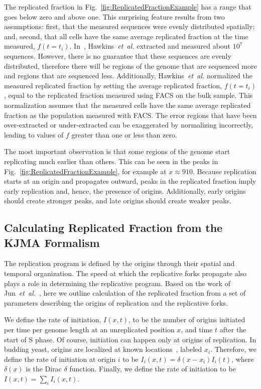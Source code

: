 		The replicated fraction in Fig.~\ref{fig:ReplicatedFractionExample} has a range that goes below zero and above one.
		This surprising feature results from two assumptions: first, that the measured sequences were evenly distributed spatially; and, second, that all cells have the same average replicated fraction at the time measured, $f(t=t_i)$.
		In~\cite{StochasticTermination}, Hawkins~\emph{et~al.} extracted and measured about $10^7$ sequences.
		However, there is no guarantee that these sequences are evenly distributed, therefore there will be regions of the genome that are sequenced more and regions that are sequenced less.
		Additionally, Hawkins~\emph{et~al.} normalized the measured replicated fraction by setting the average replicated fraction, $f(t=t_i)$, equal to the replicated fraction measured using FACS on the bulk sample.
		This normalization assumes that the measured cells have the same average replicated fraction as the population measured with FACS.
		The error regions that have been over-extracted or under-extracted can be exaggerated by normalizing incorrectly, leading to values of $f$ greater than one or less than zero.
		
		The most important observation is that some regions of the genome start replicating much earlier than others.
		This can be seen in the peaks in Fig.~\ref{fig:ReplicatedFractionExample}, for example at $x \approx 910$.
		Because replication starts at an origin and propagates outward, peaks in the replicated fraction imply early replication and, hence, the presence of origins.
		Additionally, early origins should create stronger peaks, and late origins should create weaker peaks.
		
		
		\subsection{Calculating Replicated Fraction from the KJMA Formalism}
		\label{subsec:KJMA}
		
		The replication program is defined by the origins through their spatial and temporal organization.
		The speed at which the replicative forks propagate also plays a role in determining the replicative program.
		Based on the work of Jun~\emph{et~al.}~\cite{KJMA1}, here we outline calculation of the replicated fraction from a set of parameters describing the origins of replication and the replicative forks.
		
		We define the rate of initiation, $I(x,t)$, to be the number of origins initiated per time per genome length at an unreplicated position $x$, and time $t$ after the start of S phase.
		Of course, initiation can happen only at origins of replication.
		In budding yeast, origins are localized at known locations~\cite{OriDB}, labeled $x_i$.
		Therefore, we define the rate of initiation at origin $i$ to be $I_i(x,t)=\delta(x-x_i)I_i(t)$, where $\delta(x)$ is the Dirac $\delta$ function.
		Finally, we define the rate of initiation to be $I(x,t) = \sum\limits_i I_i(x,t)$.
		
